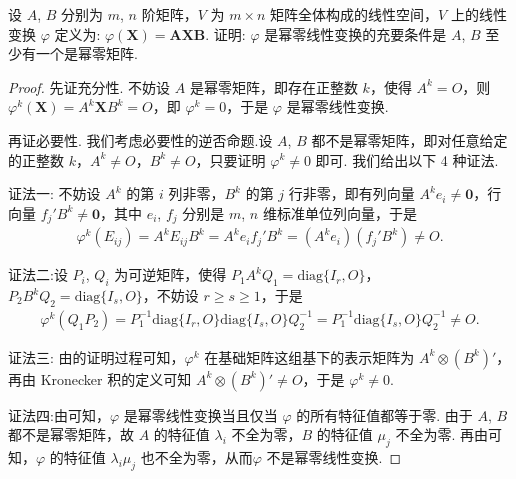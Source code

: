 \documentclass[../../main.tex]{subfiles}%
\begin{document}
\begin{example}
设 $A$, $B$ 分别为 $m$, $n$ 阶矩阵，$V$ 为 $m\times n$ 矩阵全体构成的线性空间，$V$ 上的线性变换 $\varphi$ 定义为: $\varphi(\boldsymbol{X}) = \boldsymbol{A}\boldsymbol{X}\boldsymbol{B}$. 证明: $\varphi$ 是幂零线性变换的充要条件是 $A$, $B$ 至少有一个是幂零矩阵.
\end{example}
\begin{proof}
先证充分性. 不妨设 $A$ 是幂零矩阵，即存在正整数 $k$，使得 $A^k = O$，则 $\varphi^k(\boldsymbol{X}) = A^k\boldsymbol{X}B^k = O$，即 $\varphi^k = 0$，于是 $\varphi$ 是幂零线性变换.

再证必要性. 我们考虑必要性的逆否命题.设 $A$, $B$ 都不是幂零矩阵，即对任意给定的正整数 $k$，$A^k\neq O$，$B^k\neq O$，只要证明 $\varphi^k\neq 0$ 即可. 我们给出以下 4 种证法.

{\color{blue}证法一:}
不妨设 $A^k$ 的第 $i$ 列非零，$B^k$ 的第 $j$ 行非零，即有列向量 $A^ke_i\neq \boldsymbol{0}$，行向量 $f_j'B^k\neq \boldsymbol{0}$，其中 $e_i$, $f_j$ 分别是 $m$, $n$ 维标准单位列向量，于是
\begin{align*}
\varphi^k(E_{ij}) = A^kE_{ij}B^k = A^ke_if_j'B^k = (A^ke_i)(f_j'B^k)\neq O.
\end{align*}

{\color{blue}证法二:}设 $P_i$, $Q_i$ 为可逆矩阵，使得 $P_1A^kQ_1 = \mathrm{diag}\{I_r, O\}$，$P_2B^kQ_2 = \mathrm{diag}\{I_s, O\}$，不妨设 $r\geqslant  s\geqslant  1$，于是
\begin{align*}
\varphi^k(Q_1P_2) = P_1^{-1}\mathrm{diag}\{I_r, O\}\mathrm{diag}\{I_s, O\}Q_2^{-1} = P_1^{-1}\mathrm{diag}\{I_s, O\}Q_2^{-1}\neq O.
\end{align*}

{\color{blue}证法三:} 由的证明过程可知，$\varphi^k$ 在基础矩阵这组基下的表示矩阵为 $A^k\otimes (B^k)'$，再由 Kronecker 积的定义可知 $A^k\otimes (B^k)'\neq O$，于是 $\varphi^k\neq 0$.

{\color{blue}证法四:}由可知，$\varphi$ 是幂零线性变换当且仅当 $\varphi$ 的所有特征值都等于零. 由于 $A$, $B$ 都不是幂零矩阵，故 $A$ 的特征值 $\lambda_i$ 不全为零，$B$ 的特征值 $\mu_j$ 不全为零. 再由可知，$\varphi$ 的特征值 $\lambda_i\mu_j$ 也不全为零，从而$\varphi$ 不是幂零线性变换.
\end{proof}
\end{document}
